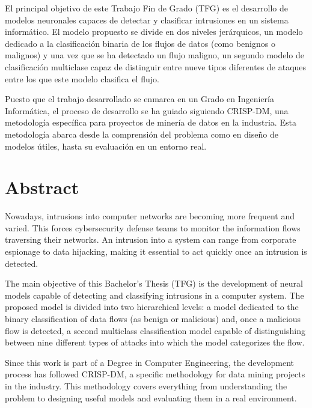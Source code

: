 \documentclass[openright,twoside,10pt]{book}
\begin{document}
El principal objetivo de este Trabajo Fin de Grado (TFG) es el desarrollo de modelos neuronales capaces de detectar y clasificar intrusiones en un sistema informático. El modelo propuesto se divide en dos niveles jerárquicos, un modelo dedicado a la clasificación binaria de los flujos de datos (como benignos o malignos) y una vez que se ha detectado un flujo maligno, un segundo modelo de clasificación multiclase capaz de distinguir entre nueve tipos diferentes de ataques entre los que este modelo clasifica el flujo.

Puesto que el trabajo desarrollado se enmarca en un Grado en Ingeniería Informática, el proceso de desarrollo se ha guiado siguiendo CRISP-DM, una metodología específica para proyectos de minería de datos en la industria. Esta metodología abarca desde la comprensión del problema como en diseño de modelos útiles, hasta su evaluación en un entorno real.


\chapter*{Abstract} %
Nowadays, intrusions into computer networks are becoming more frequent and varied. This forces cybersecurity defense teams to monitor the information flows traversing their networks. An intrusion into a system can range from corporate espionage to data hijacking, making it essential to act quickly once an intrusion is detected.

The main objective of this Bachelor's Thesis (TFG) is the development of neural models capable of detecting and classifying intrusions in a computer system. The proposed model is divided into two hierarchical levels: a model dedicated to the binary classification of data flows (as benign or malicious) and, once a malicious flow is detected, a second multiclass classification model capable of distinguishing between nine different types of attacks into which the model categorizes the flow.

Since this work is part of a Degree in Computer Engineering, the development process has followed CRISP-DM, a specific methodology for data mining projects in the industry. This methodology covers everything from understanding the problem to designing useful models and evaluating them in a real environment.
\end{document}
